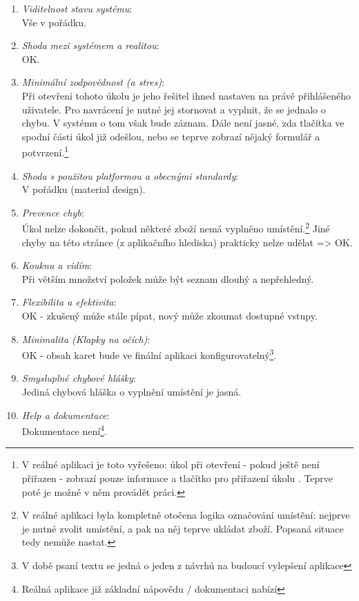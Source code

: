 \begin{enumerate}
  \item \emph{Viditelnost stavu systému}:\\Vše v pořádku.
  \item \emph{Shoda mezi systémem a realitou}:\\OK.
  \item \emph{Minimální zodpovědnost (a stres)}:\\Při otevření tohoto úkolu je jeho řešitel ihned nastaven na právě přihlášeného uživatele. Pro navrácení je nutné jej stornovat a vyplnit, že se jednalo o chybu. V systému o tom však bude záznam. Dále není jasné, zda tlačítka ve spodní části úkol již odešlou, nebo se teprve zobrazí nějaký formulář a potvrzení.\footnote{V reálné aplikaci je toto vyřešeno: úkol při otevření - pokud ještě není přiřazen - zobrazí pouze informace a tlačítko pro přiřazení úkolu . Teprve poté je možné v něm provádět práci.}
  \item \emph{Shoda s použitou platformou a obecnými standardy}:\\V pořádku (material design).
  \item \emph{Prevence chyb}:\\Úkol nelze dokončit, pokud některé zboží nemá vyplněno umístění.\footnote{V reálné aplikaci byla kompletně otočena logika označování umístění: nejprve je nutné zvolit umístění, a pak na něj teprve ukládat zboží. Popsaná situace tedy nemůže nastat.} Jiné chyby na této stránce (z aplikačního hlediska) prakticky nelze udělat => OK.
  \item \emph{Kouknu a vidím}:\\Při větším množství položek může být seznam dlouhý a nepřehledný.
  \item \emph{Flexibilita a efektivita}:\\OK - zkušený může stále pípat, nový může zkoumat dostupné vstupy.
  \item \emph{Minimalita (Klapky na očích)}:\\OK - obsah karet bude ve finální aplikaci konfigurovatelný\footnote{V době psaní textu se jedná o jeden z návrhů na budoucí vylepšení aplikace}.
  \item \emph{Smysluplné chybové hlášky}:\\Jediná chybová hláška o vyplnění umístění je jasná.
  \item \emph{Help a dokumentace}:\\Dokumentace není\footnote{Reálná aplikace již základní nápovědu / dokumentaci nabízí}.
\end{enumerate}


